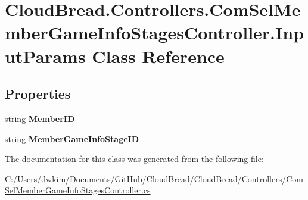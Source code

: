 \hypertarget{class_cloud_bread_1_1_controllers_1_1_com_sel_member_game_info_stages_controller_1_1_input_params}{}\section{Cloud\+Bread.\+Controllers.\+Com\+Sel\+Member\+Game\+Info\+Stages\+Controller.\+Input\+Params Class Reference}
\label{class_cloud_bread_1_1_controllers_1_1_com_sel_member_game_info_stages_controller_1_1_input_params}
\subsection*{Properties}
\begin{DoxyCompactItemize}
\item 
string {\bfseries Member\+ID}\hypertarget{class_cloud_bread_1_1_controllers_1_1_com_sel_member_game_info_stages_controller_1_1_input_params_a509857021896ffddaf73f73c7c874a6e}{}\label{class_cloud_bread_1_1_controllers_1_1_com_sel_member_game_info_stages_controller_1_1_input_params_a509857021896ffddaf73f73c7c874a6e}

\item 
string {\bfseries Member\+Game\+Info\+Stage\+ID}\hypertarget{class_cloud_bread_1_1_controllers_1_1_com_sel_member_game_info_stages_controller_1_1_input_params_a74f43b21650631bb9bf6f679ea05ed86}{}\label{class_cloud_bread_1_1_controllers_1_1_com_sel_member_game_info_stages_controller_1_1_input_params_a74f43b21650631bb9bf6f679ea05ed86}

\end{DoxyCompactItemize}


The documentation for this class was generated from the following file\+:\begin{DoxyCompactItemize}
\item 
C\+:/\+Users/dwkim/\+Documents/\+Git\+Hub/\+Cloud\+Bread/\+Cloud\+Bread/\+Controllers/\hyperlink{_com_sel_member_game_info_stages_controller_8cs}{Com\+Sel\+Member\+Game\+Info\+Stages\+Controller.\+cs}\end{DoxyCompactItemize}
